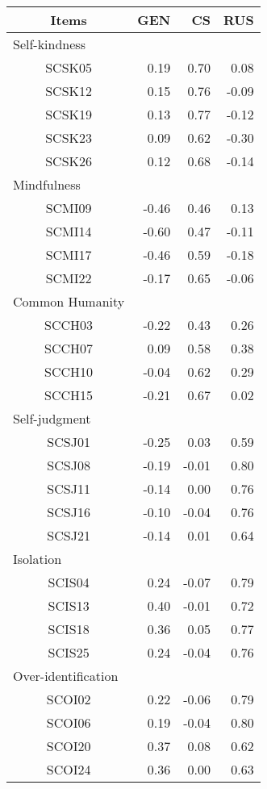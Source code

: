 \captionsetup[table]{labelformat=empty,skip=1pt}
\begin{longtable}{crrr}
\toprule
Items & GEN & CS & RUS \\ 
\midrule
\multicolumn{1}{l}{Self-kindness} \\ 
\midrule
SCSK05 & 0.19 & 0.70 & 0.08 \\ 
SCSK12 & 0.15 & 0.76 & -0.09 \\ 
SCSK19 & 0.13 & 0.77 & -0.12 \\ 
SCSK23 & 0.09 & 0.62 & -0.30 \\ 
SCSK26 & 0.12 & 0.68 & -0.14 \\ 
\midrule
\multicolumn{1}{l}{Mindfulness} \\ 
\midrule
SCMI09 & -0.46 & 0.46 & 0.13 \\ 
SCMI14 & -0.60 & 0.47 & -0.11 \\ 
SCMI17 & -0.46 & 0.59 & -0.18 \\ 
SCMI22 & -0.17 & 0.65 & -0.06 \\ 
\midrule
\multicolumn{1}{l}{Common Humanity} \\ 
\midrule
SCCH03 & -0.22 & 0.43 & 0.26 \\ 
SCCH07 & 0.09 & 0.58 & 0.38 \\ 
SCCH10 & -0.04 & 0.62 & 0.29 \\ 
SCCH15 & -0.21 & 0.67 & 0.02 \\ 
\midrule
\multicolumn{1}{l}{Self-judgment} \\ 
\midrule
SCSJ01 & -0.25 & 0.03 & 0.59 \\ 
SCSJ08 & -0.19 & -0.01 & 0.80 \\ 
SCSJ11 & -0.14 & 0.00 & 0.76 \\ 
SCSJ16 & -0.10 & -0.04 & 0.76 \\ 
SCSJ21 & -0.14 & 0.01 & 0.64 \\ 
\midrule
\multicolumn{1}{l}{Isolation} \\ 
\midrule
SCIS04 & 0.24 & -0.07 & 0.79 \\ 
SCIS13 & 0.40 & -0.01 & 0.72 \\ 
SCIS18 & 0.36 & 0.05 & 0.77 \\ 
SCIS25 & 0.24 & -0.04 & 0.76 \\ 
\midrule
\multicolumn{1}{l}{Over-identification} \\ 
\midrule
SCOI02 & 0.22 & -0.06 & 0.79 \\ 
SCOI06 & 0.19 & -0.04 & 0.80 \\ 
SCOI20 & 0.37 & 0.08 & 0.62 \\ 
SCOI24 & 0.36 & 0.00 & 0.63 \\ 
\bottomrule
\end{longtable}

